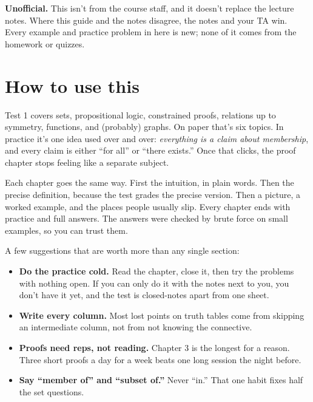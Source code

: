 \documentclass[11pt]{article}
\begin{document}
\makereporttitle

\begin{notebox}
\textbf{Unofficial.} This isn't from the course staff, and it doesn't replace the lecture notes. Where this guide and the notes disagree, the notes and your TA win. Every example and practice problem in here is new; none of it comes from the homework or quizzes.
\end{notebox}

\section*{How to use this}

Test 1 covers sets, propositional logic, constrained proofs, relations up to symmetry, functions, and (probably) graphs. On paper that's six topics. In practice it's one idea used over and over: \emph{everything is a claim about membership}, and every claim is either ``for all'' or ``there exists.'' Once that clicks, the proof chapter stops feeling like a separate subject.

Each chapter goes the same way. First the intuition, in plain words. Then the precise definition, because the test grades the precise version. Then a picture, a worked example, and the places people usually slip. Every chapter ends with practice and full answers. The answers were checked by brute force on small examples, so you can trust them.

A few suggestions that are worth more than any single section:
\begin{itemize}
\item \textbf{Do the practice cold.} Read the chapter, close it, then try the problems with nothing open. If you can only do it with the notes next to you, you don't have it yet, and the test is closed-notes apart from one sheet.
\item \textbf{Write every column.} Most lost points on truth tables come from skipping an intermediate column, not from not knowing the connective.
\item \textbf{Proofs need reps, not reading.} Chapter 3 is the longest for a reason. Three short proofs a day for a week beats one long session the night before.
\item \textbf{Say ``member of'' and ``subset of.''} Never ``in.'' That one habit fixes half the set questions.
\end{itemize}
\end{document}
